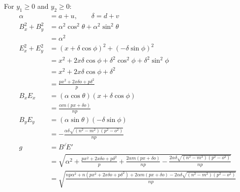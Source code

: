 \documentclass[11pt]{article}
\begin{document}
For $y_1 \geq 0$ and $y_2 \geq 0$:
\begin{align}
\alpha &= a + u, \qquad \delta = d + v\\
B_x^2 + B_y^2 &= \alpha^2\cos^2\theta + \alpha^2\sin^2\theta \nonumber\\
 &= \alpha^2\\
E_x^2 + E_y^2 &= (x + \delta\cos\phi)^2 + (-\delta\sin\phi)^2 \nonumber\\
 &= x^2 + 2x\delta\cos\phi + \delta^2\cos^2\phi + \delta^2\sin^2\phi \nonumber\\
 &= x^2 + 2x\delta\cos\phi + \delta^2 \nonumber\\
 &= \frac{px^2 + 2x\delta o + p\delta^2}{p}\\
B_xE_x &= (\alpha\cos\theta)(x + \delta\cos\phi) \nonumber\\
 &= \frac{\alpha m(px + \delta o)}{np} \\
B_yE_y &= (\alpha\sin\theta)(-\delta\sin\phi)\nonumber\\
 &= -\frac{\alpha \delta\sqrt{(n^2 - m^2)(p^2 - o^2)}}{np}\\
g &= \overline{B'E'}\nonumber\\
 &= \sqrt{
\alpha^2
+ \frac{px^2 + 2x\delta o + p\delta^2}p
+ \frac{2\alpha m(px + \delta o)}{np}
- \frac{2\alpha \delta\sqrt{(n^2 - m^2)(p^2 - o^2)}}{np}
}\nonumber\\
 &= \sqrt{\frac{
np\alpha^2  
+ n(px^2 + 2x\delta o + p\delta^2)
+ 2\alpha m(px + \delta o)
- 2\alpha \delta\sqrt{(n^2 - m^2)(p^2 - o^2)}
}{np}}\nonumber\\
\end{align}
\end{document}
